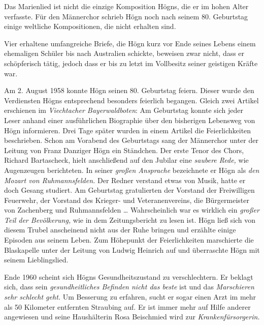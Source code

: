 \documentclass{book}
\newcommand{\zitat}[1]{\textit{#1}}
\begin{document}
Das Marienlied ist nicht die einzige Komposition Högns, die er im hohen
Alter verfasste. Für den Männerchor schrieb Högn noch nach seinem 80.
Ge\-burtstag einige weltliche Kompositionen, die nicht erhalten sind.

Vier erhaltene umfangreiche Briefe, die Högn kurz vor Ende seines
Le\-bens einem ehemaligen Schüler bis nach Australien schickte,
beweisen zwar nicht, dass er schöpferisch tätig, jedoch dass er bis zu
letzt im Vollbesitz seiner geistigen Kräfte war.

Am 2. August 1958 konnte Högn seinen 80. Geburtstag feiern. Dieser wurde
den Verdiensten Högns entsprechend besonders feierlich begangen. Gleich
zwei Artikel erschienen im \textit{Viechtacher Bayerwaldboten}: Am
Geburtstag konnte sich jeder Leser anhand einer ausführlichen
Biographie über den bisherigen Lebensweg von Högn informieren. Drei
Tage später wurden in einem Artikel die Feierlichkeiten beschrieben.
Schon am Vorabend des Geburtstags sang der Männerchor unter der Leitung
von Franz Danziger Högn ein Ständ\-chen. Der erste Tenor des Chors,
Richard Bartascheck, hielt anschließend auf den Jubilar eine
\textit{saubere Rede, }wie Augenzeugen berichteten. In seiner
\textit{großen Ansprache} bezeichnete er Högn als \textit{den Mozart
von Ruhmannsfelden.} Der Redner verstand etwas von Musik, hatte er doch
Gesang studiert. Am Geburtstag gratulierten der Vorstand der
Freiwilligen Feuerwehr, der Vorstand des Krie\-ger- und
Veteranenvereins, die Bürgermeister von Zachenberg und Ruh\-mannsfelden
… Wahrscheinlich war es wirklich ein \textit{großer Teil der
Bevölkerung,} wie in dem Zeitungsbericht zu lesen ist. Högn ließ sich
von diesem Trubel an\-scheinend nicht aus der Ruhe bringen und erzählte
einige Episoden aus sei\-nem Leben. Zum Höhepunkt der Feierlichkeiten
marschierte die Blaskapelle unter der Leitung von Ludwig Heinrich auf
und überraschte Högn mit seinem Lieblingslied.

Ende 1960 scheint sich Högns Gesundheitszustand zu verschlechtern. Er
beklagt sich, dass sein \zitat{gesundheitliches Befinden
nicht das beste} ist und das \zitat{Marschie\-ren sehr
schlecht geht. }Um Besserung zu erfahren, sucht er sogar einen Arzt im
mehr als 50 Kilometer entfernten Straubing auf. Er ist immer mehr auf
Hilfe anderer angewiesen und seine Haushälterin Rosa Beischmied wird
zur \zitat{Kran\-kenfürsorgerin.}
\end{document}
